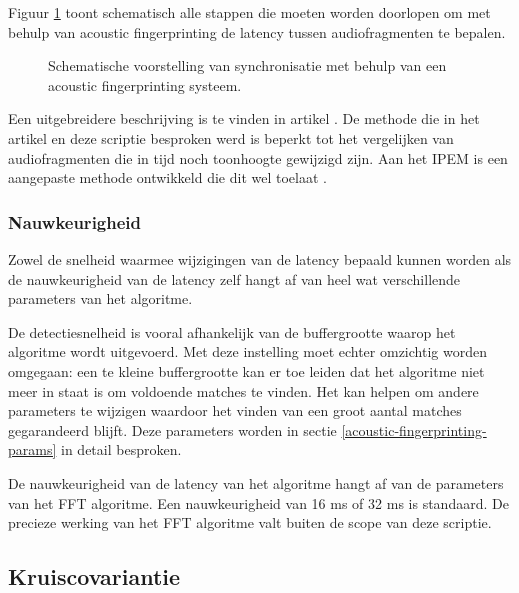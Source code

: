 Figuur \ref{schematische-synchronisatie} toont schematisch alle stappen die moeten worden doorlopen om met behulp van acoustic fingerprinting de latency tussen audiofragmenten te bepalen.

\vspace{0.3cm}
\begin{figure}[h]
	\captionsetup{width=0.7\textwidth}
	\caption[Schema synchronisatie met fingerprinting]{Schematische voorstelling van synchronisatie met behulp van een acoustic fingerprinting systeem.}
	\advance\parskip0.5cm
	
	\advance\parskip1cm
	\label{schematische-synchronisatie}
\end{figure}
\vspace{2.5cm}

Een uitgebreidere beschrijving is te vinden in artikel \cite{Wang2003a}. De methode die in het artikel en deze scriptie besproken werd is beperkt tot het vergelijken van audiofragmenten die in tijd noch toonhoogte gewijzigd zijn. Aan het IPEM is een aangepaste methode ontwikkeld die dit wel toelaat \cite{six2014panako}.

\subsubsection{Nauwkeurigheid}

Zowel de snelheid waarmee wijzigingen van de latency bepaald kunnen worden als de nauwkeurigheid van de latency zelf hangt af van heel wat verschillende parameters van het algoritme.

De detectiesnelheid is vooral afhankelijk van de buffergrootte waarop het algoritme wordt uitgevoerd. Met deze instelling moet echter omzichtig worden omgegaan: een te kleine buffergrootte kan er toe leiden dat het algoritme niet meer in staat is om voldoende matches te vinden. Het kan helpen om andere parameters te wijzigen waardoor het vinden van een groot aantal matches gegarandeerd blijft. Deze parameters worden in sectie \ref{acoustic-fingerprinting-params} in detail besproken.

De nauwkeurigheid van de latency van het algoritme hangt af van de parameters van het FFT algoritme. Een nauwkeurigheid van 16 ms of 32 ms is standaard. De precieze werking van het FFT algoritme valt buiten de scope van deze scriptie.

\subsection{Kruiscovariantie}
\label{kruiscovariantie}

